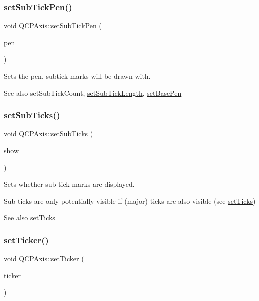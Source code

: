 \subsubsection{\texorpdfstring{setSubTickPen()}{setSubTickPen()}}
{\footnotesize\ttfamily void Q\+C\+P\+Axis\+::set\+Sub\+Tick\+Pen (\begin{DoxyParamCaption}\item[{const Q\+Pen \&}]{pen }\end{DoxyParamCaption})}

Sets the pen, subtick marks will be drawn with.

\begin{DoxySeeAlso}{See also}
set\+Sub\+Tick\+Count, \mbox{\hyperlink{class_q_c_p_axis_ab702d6fd42fc620607435339a1c2a2e1}{set\+Sub\+Tick\+Length}}, \mbox{\hyperlink{class_q_c_p_axis_a778d45fb71b3c7ab3bb7079e18b058e4}{set\+Base\+Pen}} 
\end{DoxySeeAlso}
\mbox{\label{class_q_c_p_axis_afa0ce8d4d0015ed23dcde01f8bc30106}} 
\subsubsection{\texorpdfstring{setSubTicks()}{setSubTicks()}}
{\footnotesize\ttfamily void Q\+C\+P\+Axis\+::set\+Sub\+Ticks (\begin{DoxyParamCaption}\item[{bool}]{show }\end{DoxyParamCaption})}

Sets whether sub tick marks are displayed.

Sub ticks are only potentially visible if (major) ticks are also visible (see \mbox{\hyperlink{class_q_c_p_axis_ac891409315bc379e3b1abdb162c1a011}{set\+Ticks}})

\begin{DoxySeeAlso}{See also}
\mbox{\hyperlink{class_q_c_p_axis_ac891409315bc379e3b1abdb162c1a011}{set\+Ticks}} 
\end{DoxySeeAlso}
\mbox{\label{class_q_c_p_axis_a4ee03fcd2c74d05cd1a419b9af5cfbdc}} 
\subsubsection{\texorpdfstring{setTicker()}{setTicker()}}
{\footnotesize\ttfamily void Q\+C\+P\+Axis\+::set\+Ticker (\begin{DoxyParamCaption}\item[{Q\+Shared\+Pointer$<$ \mbox{\hyperlink{class_q_c_p_axis_ticker}{Q\+C\+P\+Axis\+Ticker}} $>$}]{ticker }\end{DoxyParamCaption})}

